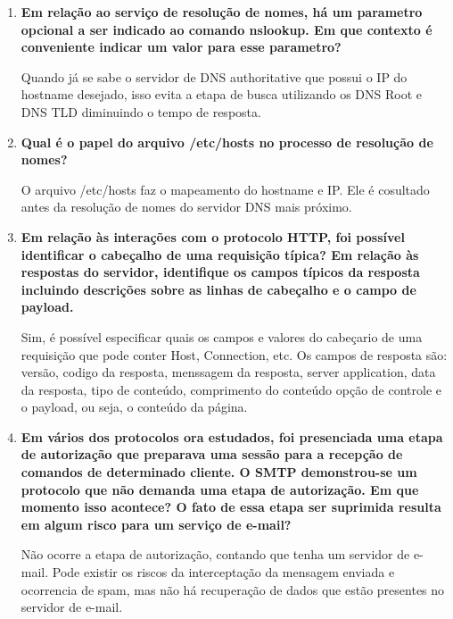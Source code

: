 \begin{enumerate}
  \item \textbf{Em relação ao serviço de resolução de nomes, há um parametro opcional a ser indicado ao
    comando nslookup. Em que contexto é conveniente indicar um valor para esse
    parametro?}

    Quando já se sabe o servidor de DNS authoritative que possui o IP do hostname desejado, isso
    evita a etapa de busca utilizando os DNS Root e DNS TLD diminuindo o tempo de resposta.

  \item \textbf{Qual é o papel do arquivo /etc/hosts no processo de resolução de nomes?}

    O arquivo /etc/hosts faz o mapeamento do hostname e IP. Ele é cosultado antes da resolução de
    nomes do servidor DNS mais próximo.

  \item \textbf{Em relação às interações com o protocolo HTTP, foi possível identificar o cabeçalho de uma
    requisição típica? Em relação às respostas do servidor, identifique os campos típicos da
    resposta incluindo descrições sobre as linhas de cabeçalho e o campo de payload.}

  Sim, é possível especificar quais os campos e valores do cabeçario de uma requisição que pode conter Host,
  Connection, etc. Os campos de resposta são: versão, codigo da resposta,
  menssagem da resposta, server application, data da resposta, tipo de conteúdo, comprimento do conteúdo
  opção de controle e o payload, ou seja, o conteúdo da página.

  \item \textbf{Em vários dos protocolos ora estudados, foi presenciada uma etapa de autorização que
    preparava uma sessão para a recepção de comandos de determinado cliente. O SMTP
    demonstrou-se um protocolo que não demanda uma etapa de autorização. Em que momento
    isso acontece? O fato de essa etapa ser suprimida resulta em algum risco para um serviço de
    e-mail?}

    Não ocorre a etapa de autorização, contando que tenha um servidor de e-mail. Pode existir os riscos da
    interceptação da mensagem enviada e ocorrencia de spam, mas não há recuperação de dados que estão
    presentes no servidor de e-mail.

\end{enumerate}
